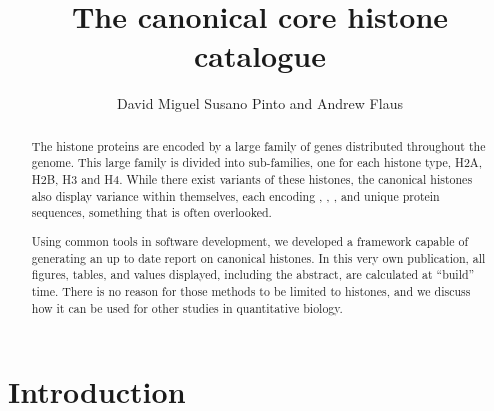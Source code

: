 \documentclass[10pt,a4paper,twocolumn,article]{memoir}
\author{David Miguel Susano Pinto and Andrew Flaus}
\title{The canonical core histone catalogue}
\begin{document}

  \maketitle

  \begin{abstract}
    The histone proteins are encoded by a large family of genes distributed throughout the
    genome. This large family is divided into sub-families, one for each histone type, H2A,
    H2B, H3 and H4. While there exist variants of these histones, the canonical histones
    also display variance within themselves, each encoding \TotalHTwoA{}, \TotalHTwoB{},
    \TotalHThree{}, and \TotalHFour{} unique protein sequences, something that is often
    overlooked.

    Using common tools in software development, we developed a framework capable of generating
    an up to date report on canonical histones. In this very own publication, all figures,
    tables, and values displayed, including the abstract, are calculated at ``build'' time.
    There is no reason for those methods to be limited to histones, and we discuss how it can
    be used for other studies in quantitative biology.
  \end{abstract}


  \section{Introduction}
\end{document}
